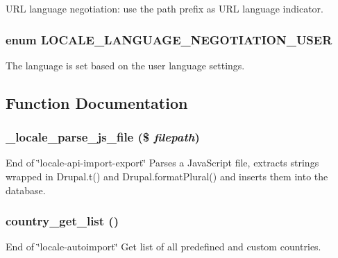 \label{locale_8inc_a850c602237657f7df487f9d1dfe951df}
URL language negotiation: use the path prefix as URL language indicator. \hypertarget{locale_8inc_a00ff3ea0a27d3f09e6d63cc6c2b04abe}{
\subsubsection[{LOCALE\_\-LANGUAGE\_\-NEGOTIATION\_\-USER}]{\setlength{\rightskip}{0pt plus 5cm}enum {\bf LOCALE\_\-LANGUAGE\_\-NEGOTIATION\_\-USER}}}
\label{locale_8inc_a00ff3ea0a27d3f09e6d63cc6c2b04abe}
The language is set based on the user language settings. 

\subsection{Function Documentation}
\hypertarget{locale_8inc_a99a08903312f70ac95f490bdd9e1e6f1}{
\subsubsection[{\_\-locale\_\-parse\_\-js\_\-file}]{\setlength{\rightskip}{0pt plus 5cm}\_\-locale\_\-parse\_\-js\_\-file (\$ {\em filepath})}}
\label{locale_8inc_a99a08903312f70ac95f490bdd9e1e6f1}
End of \char`\"{}locale-\/api-\/import-\/export\char`\"{} Parses a JavaScript file, extracts strings wrapped in Drupal.t() and Drupal.formatPlural() and inserts them into the database. \hypertarget{locale_8inc_a53c04ad515e4f3eace3532fcdbedb834}{
\subsubsection[{country\_\-get\_\-list}]{\setlength{\rightskip}{0pt plus 5cm}country\_\-get\_\-list ()}}
\label{locale_8inc_a53c04ad515e4f3eace3532fcdbedb834}
End of \char`\"{}locale-\/autoimport\char`\"{} Get list of all predefined and custom countries.

